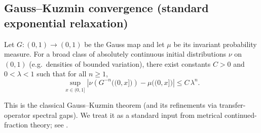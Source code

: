 \subsection{Gauss--Kuzmin convergence (standard exponential relaxation)}
\label{app:gauss_kuzmin}

\begin{theorem}
\label{thm:gauss_kuzmin}
Let $G:(0,1)\to(0,1)$ be the Gauss map and let $\mu$ be its invariant probability measure. For a broad class of absolutely continuous initial distributions $\nu$ on $(0,1)$ (e.g.\ densities of bounded variation), there exist constants $C>0$ and $0<\lambda<1$ such that for all $n\ge 1$,
\begin{equation}
\sup_{x\in(0,1]}\left|\nu\!\left(G^{-n}\big((0,x]\big)\right)-\mu\big((0,x]\big)\right|\le C\,\lambda^n.
\end{equation}
\end{theorem}
\begin{remark}
This is the classical Gauss--Kuzmin theorem (and its refinements via transfer-operator spectral gaps). We treat it as a standard input from metrical continued-fraction theory; see \cite{IosifescuKraaikamp2002}.
\end{remark}


